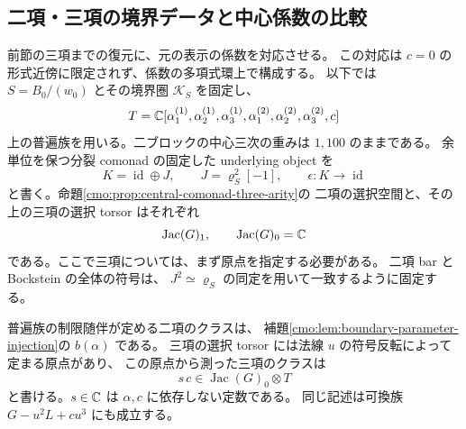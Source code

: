\subsection{二項・三項の境界データと中心係数の比較}
\label{cmo:subsec:central-parameter-comparison}

前節の三項までの復元に、元の表示の係数を対応させる。
この対応は $c=0$ の形式近傍に限定されず、係数の多項式環上で構成する。
以下では $S=B_0/(w_0)$ とその境界圏 $\mathcal K_S$ を固定し、
\[
 T=\mathbb C[\alpha^{(1)}_1,\alpha^{(1)}_2,\alpha^{(1)}_3,
       \alpha^{(2)}_1,\alpha^{(2)}_2,\alpha^{(2)}_3,c]
\]
上の普遍族を用いる。二ブロックの中心三次の重みは $1,100$ のままである。
余単位を保つ分裂 comonad の固定した underlying object を
\[
 K=\operatorname{id}\oplus J,\qquad
 J=\varrho_S^2[-1],\qquad
 \epsilon:K\longrightarrow\operatorname{id}
\]
と書く。命題\ref{cmo:prop:central-comonad-three-arity}の
二項の選択空間と、その上の三項の選択 torsor はそれぞれ
\begin{equation}\label{cmo:eq:central-two-three-parameters}
 \operatorname{Jac}(G)_1,\qquad \operatorname{Jac}(G)_0=\mathbb C
\end{equation}
である。ここで三項については、まず原点を指定する必要がある。
二項 bar と Bockstein の全体の符号は、
$J^2\simeq\varrho_S$ の同定を用いて一致するように固定する。

\begin{lemma}[普遍係数上の境界データ]\label{cmo:lem:central-universal-parameters}
普遍族の制限随伴が定める二項のクラスは、
補題\ref{cmo:lem:boundary-parameter-injection}の $b(\alpha)$ である。
三項の選択 torsor には法線 $u$ の符号反転によって定まる原点があり、
この原点から測った三項のクラスは
\begin{equation}\label{cmo:eq:central-ternary-linear}
 s\,c\in \operatorname{Jac}(G)_0\otimes T
\end{equation}
と書ける。$s\in\mathbb C$ は $\alpha,c$ に依存しない定数である。
同じ記述は可換族 $G-u^2L+cu^3$ にも成立する。
\end{lemma}

